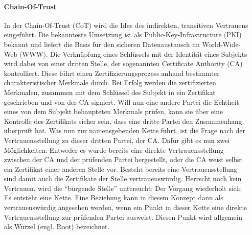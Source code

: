 \paragraph{Chain-Of-Trust}
In der Chain-Of-Trust (CoT) wird die Idee des indirekten, transitiven Vertrauens eingeführt. Die bekannteste Umsetzung ist als Public-Key-Infrastructure (PKI) bekannt und liefert die Basis für den sicheren Datenaustausch im World-Wide-Web (WWW). Die Verknüpfung eines Schlüssels mit der Identität eines Subjekts wird dabei von einer dritten Stelle, der sogenannten Certificate Authority (CA) kontrolliert. Diese führt einen Zertifizierungsprozess  anhand bestimmter charakteristischer Merkmale durch. Bei Erfolg werden die zertifizierten Merkmalen, zusammen mit dem Schlüssel des Subjekt in ein Zertifikat geschrieben und von der CA signiert. Will nun eine andere Partei die Echtheit eines von dem Subjekt behaupteten Merkmals prüfen, kann sie über eine Kontrolle des Zertifikats sicher sein, dass eine dritte Partei den Zusammenhang überprüft hat. Was nun zur namensgebenden Kette führt, ist die Frage nach der Vertrauensstellung zu dieser dritten Partei, der CA. Dafür gibt es nun zwei Möglichkeiten: Entweder es wurde bereits eine direkte Vertrauensstellung zwischen der CA und der prüfenden Partei hergestellt, oder die CA weist selbst ein Zertifikat einer anderen Stelle vor. Besteht bereits eine Vertrauensstellung sind damit auch die Zertifikate der Stelle vertrauenswürdig. Herrscht noch kein Vertrauen, wird die ``bürgende Stelle'' untersucht; Der Vorgang wiederholt sich; Es entsteht eine Kette. Eine Beziehung kann in diesem Konzept dann als vertrauenswürdig angesehen werden, wenn ein Punkt in dieser Kette eine direkte Vertrauensstellung zur prüfenden Partei ausweist. Diesen Punkt wird allgemein als Wurzel (engl. Root) bezeichnet\cite[p. 423 ff.]{Eckert2013}.  
